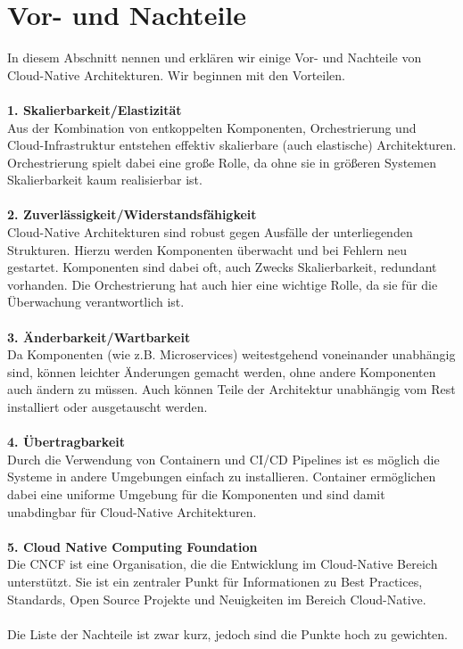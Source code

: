 \section{Vor- und Nachteile}
In diesem Abschnitt nennen und erklären wir einige Vor- und Nachteile von Cloud-Native Architekturen. Wir beginnen mit den Vorteilen.\\
\\
\textbf{1. Skalierbarkeit/Elastizität}\\
Aus der Kombination von entkoppelten Komponenten, Orchestrierung und Cloud-Infrastruktur entstehen effektiv skalierbare (auch elastische) Architekturen. Orchestrierung spielt dabei eine große Rolle, da ohne sie in größeren Systemen Skalierbarkeit kaum realisierbar ist.\\
\\
\textbf{2. Zuverlässigkeit/Widerstandsfähigkeit}\\
Cloud-Native Architekturen sind robust gegen Ausfälle der unterliegenden Strukturen. Hierzu werden Komponenten überwacht und bei Fehlern neu gestartet. Komponenten sind dabei oft, auch Zwecks Skalierbarkeit, redundant vorhanden. Die Orchestrierung hat auch hier eine wichtige Rolle, da sie für die Überwachung verantwortlich ist.\\
\\
\textbf{3. Änderbarkeit/Wartbarkeit}\\
Da Komponenten (wie z.B. Microservices) weitestgehend voneinander unabhängig sind, können leichter Änderungen gemacht werden, ohne andere Komponenten auch ändern zu müssen. Auch können Teile der Architektur unabhängig vom Rest installiert oder ausgetauscht werden.\\
\\
\textbf{4. Übertragbarkeit}\\
Durch die Verwendung von Containern und CI/CD Pipelines ist es möglich die Systeme in andere Umgebungen einfach zu installieren. Container ermöglichen dabei eine uniforme Umgebung für die Komponenten und sind damit unabdingbar für Cloud-Native Architekturen. \\
\\
\textbf{5. Cloud Native Computing Foundation}\\
Die CNCF ist eine Organisation, die die Entwicklung im Cloud-Native Bereich unterstützt. Sie ist ein zentraler Punkt für Informationen zu Best Practices, Standards, Open Source Projekte und Neuigkeiten im Bereich Cloud-Native.\\
\\
Die Liste der Nachteile ist zwar kurz, jedoch sind die Punkte hoch zu gewichten.\\
